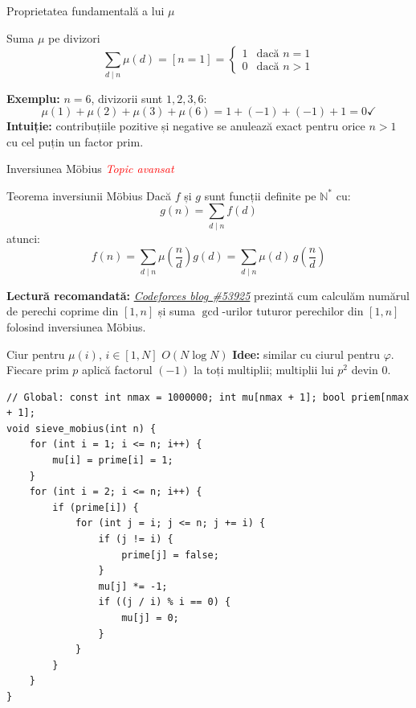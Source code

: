 \documentclass[10pt]{beamer}
\begin{document}
\begin{frame}{Proprietatea fundamentală a lui $\mu$}
  \begin{block}{Suma $\mu$ pe divizori}
    \[
      \sum_{d \mid n} \mu(d) = [n = 1] =
      \begin{cases} 1 & \text{dacă } n = 1 \\ 0 & \text{dacă } n > 1 \end{cases}
    \]
  \end{block}
  \smallskip
  \textbf{Exemplu:} $n = 6$, divizorii sunt $1, 2, 3, 6$:
  \[
    \mu(1) + \mu(2) + \mu(3) + \mu(6) = 1 + (-1) + (-1) + 1 = 0 \checkmark
  \]
  \textbf{Intuiție:} contribuțiile pozitive și negative se anulează exact
  pentru orice $n > 1$ cu cel puțin un factor prim.
\end{frame}

\begin{frame}{Inversiunea Möbius \textemdash{} \textcolor{red}{\textsl{Topic avansat}}}
  \begin{block}{Teorema inversiunii Möbius}
    Dacă $f$ și $g$ sunt funcții definite pe $\mathbb{N}^*$ cu:
    \[
      g(n) = \sum_{d \mid n} f(d)
    \]
    atunci:
    \[
      f(n) = \sum_{d \mid n} \mu\!\left(\frac{n}{d}\right) g(d)
      = \sum_{d \mid n} \mu(d) \, g\!\left(\frac{n}{d}\right)
    \]
  \end{block}
  \smallskip
  \textbf{Lectură recomandată:}
  \href{https://codeforces.com/blog/entry/53925}{\textit{Codeforces blog \#53925}}
  \textemdash{} prezintă cum calculăm numărul de perechi coprime din $[1,n]$
  și suma $\gcd$-urilor tuturor perechilor din $[1,n]$ folosind inversiunea Möbius.
\end{frame}


\begin{frame}[fragile]{Ciur pentru $\mu(i)$, $i \in [1, N]$ \textemdash{} $O(N \log N)$}
  \textbf{Idee:} similar cu ciurul pentru $\varphi$. Fiecare prim $p$ aplică
  factorul $(-1)$ la toți multiplii; multiplii lui $p^2$ devin 0.
  \begin{lstlisting}
// Global: const int nmax = 1000000; int mu[nmax + 1]; bool priem[nmax + 1];
void sieve_mobius(int n) {
    for (int i = 1; i <= n; i++) {
        mu[i] = prime[i] = 1;
    }
    for (int i = 2; i <= n; i++) {
        if (prime[i]) {
            for (int j = i; j <= n; j += i) {
                if (j != i) {
                    prime[j] = false;
                }
                mu[j] *= -1;
                if ((j / i) % i == 0) {
                    mu[j] = 0;
                }
            }
        }
    }
}
  \end{lstlisting}
\end{frame}
\end{document}
